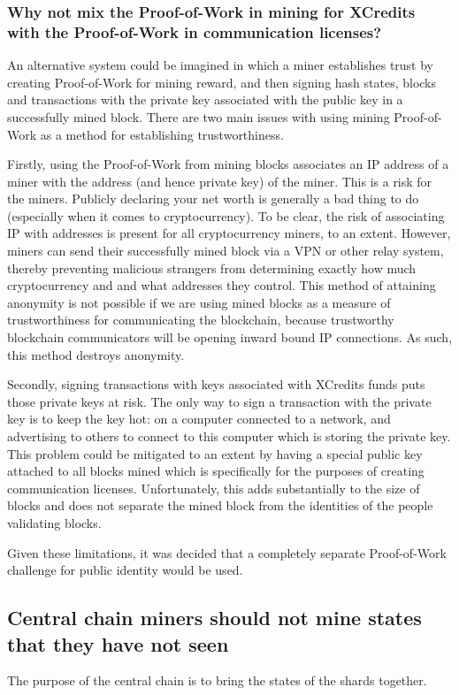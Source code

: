 \documentclass[a4paper,12pt]{article}
\begin{document}
\subsubsection{Why not mix the Proof-of-Work in mining for XCredits with the Proof-of-Work in communication licenses?}
An alternative system could be imagined in which a miner establishes trust by creating Proof-of-Work for mining reward, and then signing hash states, blocks and transactions with the private key associated with the public key in a successfully mined block. There are two main issues with using mining Proof-of-Work as a method for establishing trustworthiness.

Firstly, using the Proof-of-Work from mining blocks associates an IP address of a miner with the address (and hence private key) of the miner. This is a risk for the miners. Publicly declaring your net worth is generally a bad thing to do (especially when it comes to cryptocurrency). To be clear, the risk of associating IP with addresses is present for all cryptocurrency miners, to an extent. However, miners can send their successfully mined block via a VPN or other relay system, thereby preventing malicious strangers from determining exactly how much cryptocurrency and and what addresses they control. This method of attaining anonymity is not possible if we are using mined blocks as a measure of trustworthiness for communicating the blockchain, because trustworthy blockchain communicators will be opening inward bound IP connections. As such, this method destroys anonymity.

Secondly, signing transactions with keys associated with XCredits funds puts those private keys at risk. The only way to sign a transaction with the private key is to keep the key hot: on a computer connected to a network, and advertising to others to connect to this computer which is storing the private key. This problem could be mitigated to an extent by having a special public key attached to all blocks mined which is specifically for the purposes of creating communication licenses. Unfortunately, this adds substantially to the size of blocks and does not separate the mined block from the identities of the people validating blocks.

Given these limitations, it was decided that a completely separate Proof-of-Work challenge for public identity would be used. 

\subsection{Central chain miners should not mine states that they have not seen}
The purpose of the central chain is to bring the states of the shards together.
\end{document}
